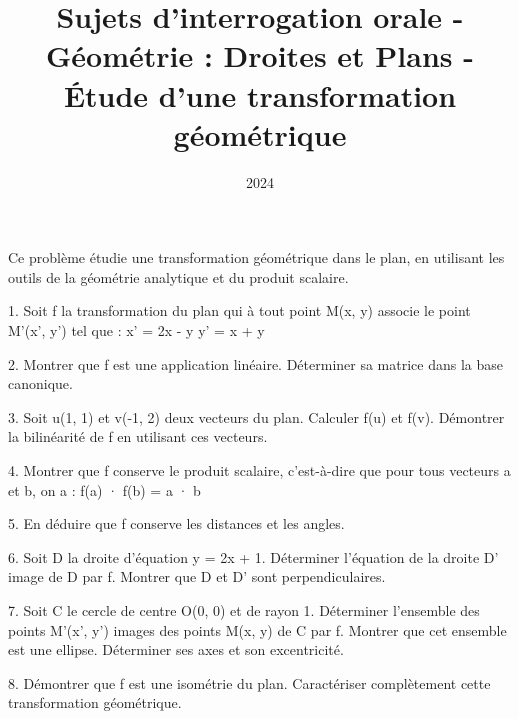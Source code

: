 \documentclass[10pt,a4paper]{article}
\title{Sujets d'interrogation orale - Géométrie : Droites et Plans - Étude d'une transformation géométrique}
\author{}
\date{2024}
\begin{document}
\maketitle

Ce problème étudie une transformation géométrique dans le plan, en utilisant les outils de la géométrie analytique et du produit scalaire.

1. Soit f la transformation du plan qui à tout point M(x, y) associe le point M'(x', y') tel que :
   x' = 2x - y
   y' = x + y

2. Montrer que f est une application linéaire. Déterminer sa matrice dans la base canonique.

3. Soit u(1, 1) et v(-1, 2) deux vecteurs du plan.
  \ql Calculer f(u) et f(v).
  \ql Démontrer la bilinéarité de f en utilisant ces vecteurs.

4. Montrer que f conserve le produit scalaire, c'est-à-dire que pour tous vecteurs a et b, on a :
   f(a) · f(b) = a · b

5. En déduire que f conserve les distances et les angles.

6. Soit D la droite d'équation y = 2x + 1.
  \ql Déterminer l'équation de la droite D' image de D par f.
  \ql Montrer que D et D' sont perpendiculaires.

7. Soit C le cercle de centre O(0, 0) et de rayon 1.
  \ql Déterminer l'ensemble des points M'(x', y') images des points M(x, y) de C par f.
  \ql Montrer que cet ensemble est une ellipse. Déterminer ses axes et son excentricité.

8. Démontrer que f est une isométrie du plan. Caractériser complètement cette transformation géométrique.
\end{document}
